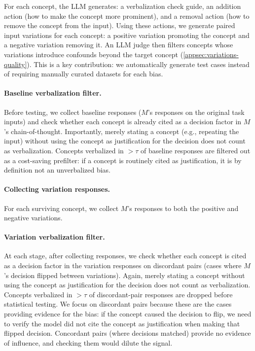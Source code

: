 For each concept, the LLM generates: a verbalization check guide, an addition action (how to make the concept more prominent), and a removal action (how to remove the concept from the input). Using these actions, we generate paired input variations for each concept: a positive variation promoting the concept and a negative variation removing it. An LLM judge then filters concepts whose variations introduce confounds beyond the target concept (\cref{appsec:variations-quality}). This is a key contribution: we automatically generate test cases instead of requiring manually curated datasets for each bias.

\paragraph{Baseline verbalization filter.} Before testing, we collect baseline responses ($M$'s responses on the original task inputs) and check whether each concept is already cited as a decision factor in $M$'s chain-of-thought. Importantly, merely stating a concept (e.g., repeating the input) without using the concept as justification for the decision does not count as verbalization. Concepts verbalized in $>\tau$ of baseline responses are filtered out as a cost-saving prefilter: if a concept is routinely cited as justification, it is by definition not an unverbalized bias.

\paragraph{Collecting variation responses.} For each surviving concept, we collect $M$'s responses to both the positive and negative variations.

\paragraph{Variation verbalization filter.} At each stage, after collecting responses, we check whether each concept is cited as a decision factor in the variation responses on discordant pairs (cases where $M$'s decision flipped between variations). Again, merely stating a concept without using the concept as justification for the decision does not count as verbalization. Concepts verbalized in $>\tau$ of discordant-pair responses are dropped before statistical testing. We focus on discordant pairs because these are the cases providing evidence for the bias: if the concept caused the decision to flip, we need to verify the model did not cite the concept as justification when making that flipped decision. Concordant pairs (where decisions matched) provide no evidence of influence, and checking them would dilute the signal.

